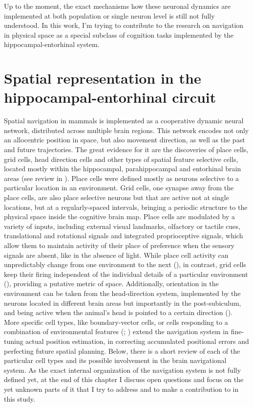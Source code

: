 Up to the moment, the exact mechanisms how these neuronal dynamics are implemented at both  population or single neuron level is still not fully understood. In this work, I’m trying to contribute to the research on navigation in physical space as a special subclass of cognition tasks implemented by the hippocampal-entorhinal system.


\section{Spatial representation in the hippocampal-entorhinal circuit}
\label{sec:spatial_repr}

Spatial navigation in mammals is implemented as a cooperative dynamic neural network, distributed across multiple brain regions. This network encodes not only an allocentric position in space, but also movement direction, as well as the past and future trajectories. The great evidence for it are the discoveries of place cells, grid cells, head direction cells and other types of spatial feature selective cells, located mostly within the hippocampal, parahippocampal and entorhinal brain areas (see review in \cite{Moser2015}). Place cells were defined mostly as neurons selective to a particular location in an environment. Grid cells, one synapse away from the place cells, are also place selective neurons but that are active not at single locations, but at a regularly-spaced intervals, bringing a periodic structure to the physical space inside the cognitive brain map. Place cells are modulated by a variety of inputs, including external visual landmarks, olfactory or tactile cues, translational and rotational signals and integrated proprioceptive signals, which allow them to maintain activity of their place of preference when the sensory signals are absent, like in the absence of light. While place cell activity can unpredictably change from one environment to the next (\cite{Colgin2008}), in contrast, grid cells keep their firing independent of the individual details of a particular environment (\cite{Fyhn2007}), providing a putative metric of space. Additionally, orientation in the environment can be taken from the head-direction system, implemented by the neurons located in different brain areas but importantly in the post-subiculum, and being active when the animal's head is pointed to a certain direction (\cite{Taube2007}). More specific cell types, like boundary-vector cells, or cells responding to a combination of environmental features (\cite{Deshmukh2013}; \cite{Hooydal2019}) extend the navigation system in fine-tuning actual position estimation, in correcting accumulated positional errors and perfecting future spatial planning. Below, there is a short review of each of the particular cell types and its possible involvement in the brain navigational system. As the exact internal organization of the navigation system is not fully defined yet, at the end of this chapter I discuss open questions and focus on the yet unknown parts of it that I try to address and to make a contribution to in this study.

